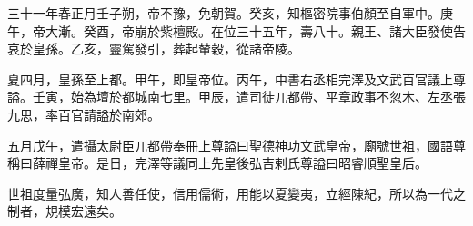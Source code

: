 \begin{pinyinscope}
 三十一年春正月壬子朔，帝不豫，免朝賀。癸亥，知樞密院事伯顏至自軍中。庚午，帝大漸。癸酉，帝崩於紫檀殿。在位三十五年，壽八十。親王、諸大臣發使告哀於皇孫。乙亥，靈駕發引，葬起輦穀，從諸帝陵。



 夏四月，皇孫至上都。甲午，即皇帝位。丙午，中書右丞相完澤及文武百官議上尊謚。壬寅，始為壇於都城南七里。甲辰，遣司徒兀都帶、平章政事不忽木、左丞張九思，率百官請謚於南郊。



 五月戊午，遣攝太尉臣兀都帶奉冊上尊謚曰聖德神功文武皇帝，廟號世祖，國語尊稱曰薛禪皇帝。是日，完澤等議同上先皇後弘吉剌氏尊謚曰昭睿順聖皇后。



 世祖度量弘廣，知人善任使，信用儒術，用能以夏變夷，立經陳紀，所以為一代之制者，規模宏遠矣。



\end{pinyinscope}